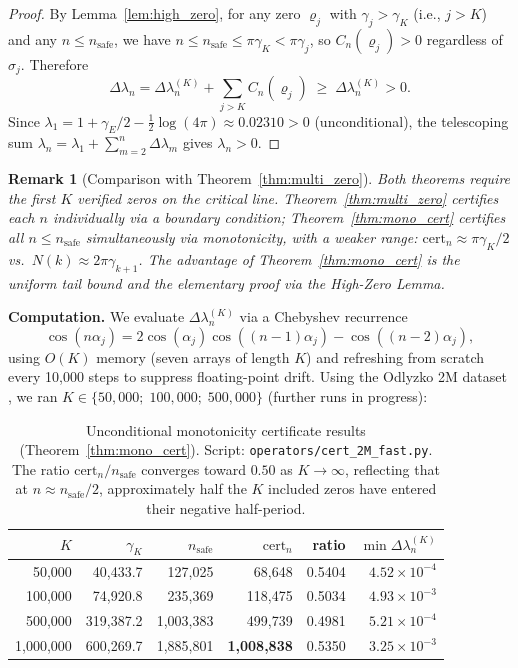 \documentclass[11pt]{article}
\newtheorem{remark}[theorem]{Remark}
\begin{document}
\begin{proof}
By Lemma~\ref{lem:high_zero}, for any zero $\varrho_j$ with $\gamma_j > \gamma_K$ (i.e., $j > K$) and any
$n \le n_{\mathrm{safe}}$, we have $n \le n_{\mathrm{safe}} \le \pi\gamma_K < \pi\gamma_j$,
so $C_n(\varrho_j) > 0$ regardless of $\sigma_j$.  Therefore
\[
  \Delta\lambda_n = \Delta\lambda_n^{(K)} + \sum_{j > K} C_n(\varrho_j) \;\ge\; \Delta\lambda_n^{(K)} > 0.
\]
Since $\lambda_1 = 1 + \gamma_E/2 - \tfrac{1}{2}\log(4\pi) \approx 0.02310 > 0$ (unconditional),
the telescoping sum $\lambda_n = \lambda_1 + \sum_{m=2}^n \Delta\lambda_m$ gives $\lambda_n > 0$.
\end{proof}

\begin{remark}[Comparison with Theorem~\ref{thm:multi_zero}]
Both theorems require the first $K$ verified zeros on the critical line.
Theorem~\ref{thm:multi_zero} certifies each $n$ individually via a boundary condition;
Theorem~\ref{thm:mono_cert} certifies all $n \le n_{\mathrm{safe}}$ simultaneously via
monotonicity, with a weaker range: $\mathrm{cert}_n \approx \pi\gamma_K/2$
vs.\ $N(k) \approx 2\pi\gamma_{k+1}$.  The advantage of Theorem~\ref{thm:mono_cert}
is the uniform tail bound and the elementary proof via the High-Zero Lemma.
\end{remark}

\noindent\textbf{Computation.}
We evaluate $\Delta\lambda_n^{(K)}$ via a Chebyshev recurrence
\[
  \cos(n\alpha_j) = 2\cos(\alpha_j)\cos((n{-}1)\alpha_j) - \cos((n{-}2)\alpha_j),
\]
using $O(K)$ memory (seven arrays of length $K$) and refreshing from scratch every 10{,}000 steps
to suppress floating-point drift.  Using the Odlyzko 2M dataset \cite{odlyzko1987}, we ran $K \in
\{50{,}000;\;100{,}000;\;500{,}000\}$ (further runs in progress):

\begin{table}[H]
\centering
\begin{tabular}{rrrrrr}
\toprule
$K$ & $\gamma_K$ & $n_{\mathrm{safe}}$ & $\mathrm{cert}_n$ & ratio & $\min\Delta\lambda_n^{(K)}$ \\
\midrule
50{,}000  & 40{,}433.7 & 127{,}025  & 68{,}648  & 0.5404 & $4.52\times10^{-4}$ \\
100{,}000 & 74{,}920.8 & 235{,}369  & 118{,}475 & 0.5034 & $4.93\times10^{-3}$ \\
500{,}000 & 319{,}387.2 & 1{,}003{,}383 & 499{,}739 & 0.4981 & $5.21\times10^{-4}$ \\
1{,}000{,}000 & 600{,}269.7 & 1{,}885{,}801 & \textbf{1{,}008{,}838} & 0.5350 & $3.25\times10^{-3}$ \\
\bottomrule
\end{tabular}
\caption{Unconditional monotonicity certificate results (Theorem~\ref{thm:mono_cert}).
Script: \texttt{operators/cert\_2M\_fast.py}.
The ratio $\mathrm{cert}_n/n_{\mathrm{safe}}$ converges toward $0.50$ as $K\to\infty$,
reflecting that at $n\approx n_{\mathrm{safe}}/2$, approximately half the $K$ included zeros
have entered their negative half-period.}
\end{table}
\end{document}
